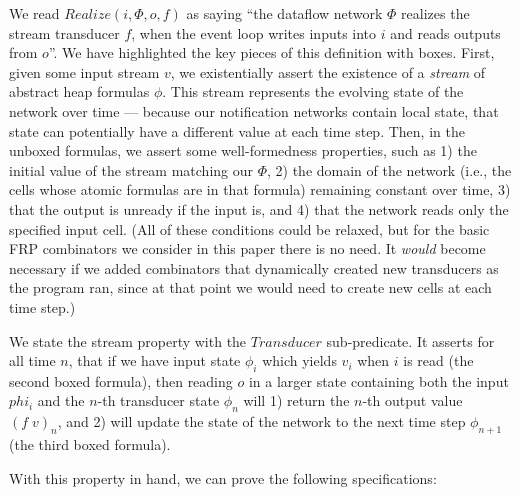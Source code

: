 We read $Realize(i, \Phi, o, f)$ as saying ``the dataflow network
$\Phi$ realizes the stream transducer $f$, when the event loop writes
inputs into $i$ and reads outputs from $o$''. We have highlighted the
key pieces of this definition with boxes. First, given some input
stream $v$, we existentially assert the existence of a \emph{stream}
of abstract heap formulas $\phi$. This stream represents the evolving
state of the network over time --- because our notification networks
contain local state, that state can potentially have a different value
at each time step. Then, in the unboxed formulas, we assert some
well-formedness properties, such as 1) the initial value of the stream
matching our $\Phi$, 2) the domain of the network (i.e., the cells whose
atomic formulas are in that formula) remaining constant
over time, 3) that the output is unready if the input is, and 4) that
the network reads only the specified input cell. (All of these
conditions could be relaxed, but for the basic FRP combinators we
consider in this paper there is no need. It \emph{would} become
necessary if we added combinators that dynamically created new
transducers as the program ran, since at that point we would need to
create new cells at each time step.)

We state the stream property with the $Transducer$ sub-predicate. It
asserts for all time $n$, that if we have input state $\phi_i$ which
yields $v_i$ when $i$ is read (the second boxed formula), then 
reading $o$ in a larger state containing both the input $phi_i$ and the
$n$-th transducer state $\phi_n$ will 1) return the $n$-th output
value $(f\;v)_n$, and 2) will update the state of the network to 
the next time step $\phi_{n+1}$ (the third boxed formula). 

With this property in hand, we can prove the following specifications: 

